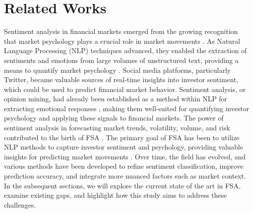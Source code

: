 \section{Related Works}
\label{sec:related_works}
Sentiment analysis in financial markets emerged from the growing recognition that market psychology plays a crucial role in market movements \cite{adaptive_lo_2004}. As Natural Language Processing (NLP) techniques advanced, they enabled the extraction of sentiments and emotions from large volumes of unstructured text, providing a means to quantify market psychology \cite{twitter_bollen_2011}. Social media platforms, particularly Twitter, became valuable sources of real-time insights into investor sentiment, which could be used to predict financial market behavior. Sentiment analysis, or opinion mining, had already been established as a method within NLP for extracting emotional responses \cite{murfi2024bert}, making them well-suited for quantifying investor psychology and applying these signals to financial markets. The power of sentiment analysis in forecasting market trends, volatility, volume, and risk contributed to the birth of FSA \cite{man2019financial, du2024financial}. The primary goal of FSA has been to utilize NLP methods to capture investor sentiment and psychology, providing valuable insights for predicting market movements \cite{du2024financial}. Over time, the field has evolved, and various methods have been developed to refine sentiment classification, improve prediction accuracy, and integrate more nuanced factors such as market context. In the subsequent sections, we will explore the current state of the art in FSA, examine existing gaps, and highlight how this study aims to address these challenges.

